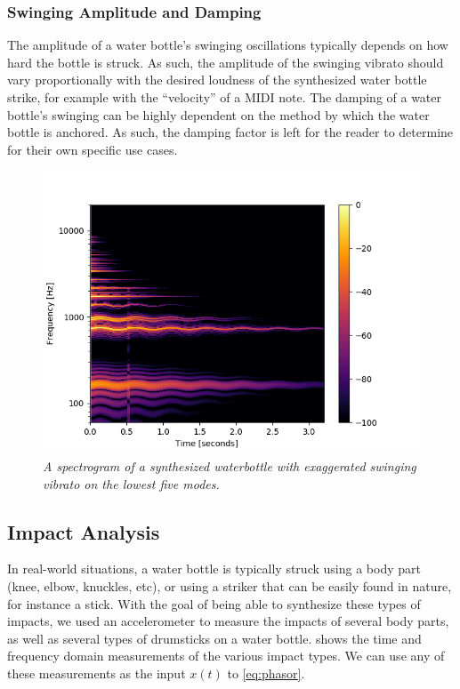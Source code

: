 \documentclass[twoside,a4paper]{article}
\begin{document}
\subsubsection{Swinging Amplitude and Damping}
%
The amplitude of a water bottle's swinging oscillations typically depends
on how hard the bottle is struck. As such, the amplitude of the swinging
vibrato should vary proportionally with the desired loudness of the synthesized water bottle strike, for example with the ``velocity'' of a MIDI note.
The damping of a water bottle's swinging can be highly dependent on the method
by which the water bottle is anchored. As such, the damping factor is left
for the reader to determine for their own specific use cases.
%
\begin{figure}
    \centering
    \includegraphics[width=\linewidth,trim={0 0 1cm 1cm},clip]{../Figures/Specgrams/Vibrato.png}
    \caption{\it{A spectrogram of a synthesized waterbottle with exaggerated swinging vibrato on the lowest five modes.}}
    \label{fig:swinging-vibrato}
\end{figure}

%
\subsection{Impact Analysis} \label{sec:impact}
%
In real-world situations, a water bottle is typically struck using a body part
(knee, elbow, knuckles, etc), or using a striker that can be easily found in
nature, for instance a stick. With the goal of being able to synthesize these
types of impacts, we used an accelerometer to measure the impacts of
several body parts, as well as several types of drumsticks on a water bottle.
 shows the time and frequency domain
measurements of the various impact types. We can use any of these measurements as the input $x(t)$ to \eqref{eq:phasor}.
\end{document}
